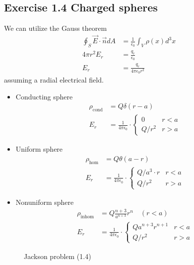 \documentclass[10pt,a4paper]{book}
\theoremstyle{definition}
\begin{document}
\subsection{Exercise 1.4 Charged spheres}
We can utilize the Gauss theorem
\begin{align}
\oint_S\vec{E}\cdot\vec{n}dA&=\frac{1}{\epsilon_0}\int_V\rho(x)d^3x\\
4\pi r^2E_r&=\frac{q_r}{\epsilon_0}\\
E_r&=\frac{q_r}{4\pi\epsilon_0r^2}
\end{align}
assuming a radial electrical field.
\begin{itemize}
\item Conducting sphere
\begin{align}
\rho_\text{cond}&=Q\delta(r-a)\\
E_r&=\frac{1}{4\pi\epsilon_0}\cdot\left\{
\begin{array}{ll}
0 & r<a\\
Q/r^2 & r>a
\end{array}
\right.
\end{align}

\item Uniform sphere
\begin{align}
\rho_\text{hom}&=Q\theta(a-r)\\
E_r&=\frac{1}{4\pi\epsilon_0}\cdot\left\{
\begin{array}{ll}
Q/a^3\cdot r & r<a\\
Q/r^2 & r>a
\end{array}
\right.
\end{align}

\item Nonuniform sphere
\begin{align}
\rho_\text{inhom}&=Q\frac{n+3}{a^{n+3}}r^n\quad(r<a)\\
E_r&=\frac{1}{4\pi\epsilon_0}\cdot\left\{
\begin{array}{ll}
Qa^{n+3}r^{n+1} & r<a\\
Q/r^2 & r>a
\end{array}
\right.
\end{align}
\end{itemize}
\begin{figure}[!h]
\centering
{}
\caption{Jackson problem (1.4)}
\end{figure}
\end{document}
